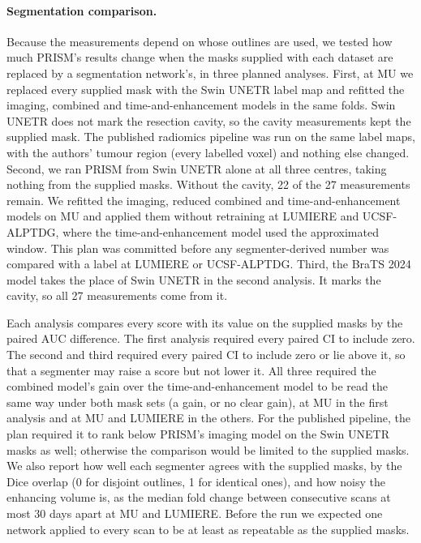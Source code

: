 \paragraph*{Segmentation comparison.} Because the measurements depend on whose outlines are used, we tested how much
PRISM's results change when the masks supplied with each dataset are replaced by a segmentation network's, in three
planned analyses. First, at MU we replaced every supplied mask with the Swin UNETR label map and refitted the imaging,
combined and time-and-enhancement models in the same folds. Swin UNETR does not mark the resection cavity, so the
cavity measurements kept the supplied mask. The published radiomics pipeline was run on the same label maps, with the
authors' tumour region (every labelled voxel) and nothing else changed. Second, we ran PRISM from Swin UNETR alone at
all three centres, taking nothing from the supplied masks. Without the cavity, 22 of the 27 measurements remain. We
refitted the imaging, reduced combined and time-and-enhancement models on MU and applied them without retraining at
LUMIERE and UCSF-ALPTDG, where the time-and-enhancement model used the approximated window. This plan was committed
before any segmenter-derived number was compared with a label at LUMIERE or UCSF-ALPTDG. Third, the BraTS 2024 model
takes the place of Swin UNETR in the second analysis. It marks the cavity, so all 27 measurements come from it.

Each analysis compares every score with its value on the supplied masks by the paired AUC difference. The first
analysis required every paired CI to include zero. The second and third required every paired CI to include zero or
lie above it, so that a segmenter may raise a score but not lower it. All three required the combined model's gain
over the time-and-enhancement model to be read the same way under both mask sets (a gain, or no clear gain), at MU in
the first analysis and at MU and LUMIERE in the others. For the published pipeline, the plan required it to rank below
PRISM's imaging model on the Swin UNETR masks as well; otherwise the comparison would be limited to the supplied
masks. We also report how well each segmenter agrees with the supplied masks, by the Dice overlap (0 for disjoint
outlines, 1 for identical ones), and how noisy the enhancing volume is, as the median fold change between consecutive
scans at most 30 days apart at MU and LUMIERE. Before the run we expected one network applied to every scan to be at
least as repeatable as the supplied masks.


